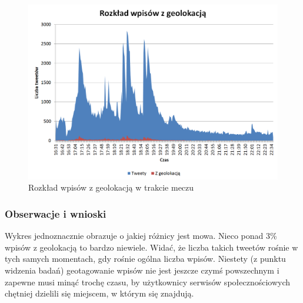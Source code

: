 \begin{figure}[ht!]
\centering
\includegraphics[width=140mm]{img/tweet-geo-w-meczu.PNG}
\caption{Rozkład wpisów z geolokacją w trakcie meczu}
\label{image:wpisy-odsetek-geotagged}
\end{figure}

\subsubsection{Obserwacje i wnioski}
Wykres jednoznacznie obrazuje o jakiej różnicy jest mowa. Nieco ponad 3\% 
wpisów z geolokacją to bardzo niewiele. Widać, że liczba takich tweetów
rośnie w tych samych momentach, gdy rośnie ogólna liczba wpisów.
Niestety (z punktu widzenia badań) geotagowanie wpisów
nie jest jeszcze czymś powszechnym i zapewne musi minąć trochę czasu,
by użytkownicy serwisów społecznościowych chętniej dzielili się miejscem,
w którym się znajdują.

